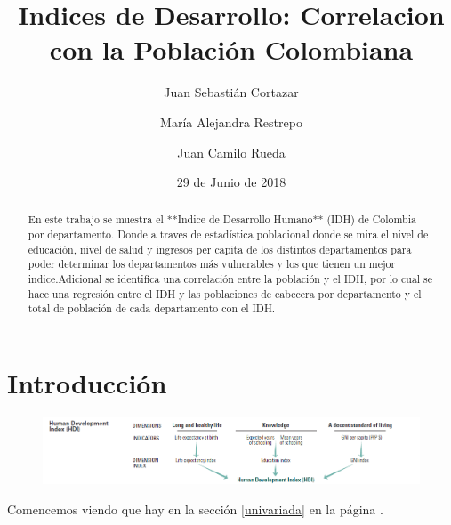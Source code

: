 \documentclass{article}
\title{Indices de Desarrollo: Correlacion con la Población Colombiana}
\author[1]{\normalsize Juan Sebastián Cortazar}
\author[2]{\normalsize María Alejandra Restrepo}
\author[3]{\normalsize Juan Camilo Rueda}
\affil[1,2,3]{\small  Universidad de los Andes\\
\texttt{{js.cortazar533,ma.restrepot,jc.rueda169}@uniandes.edu.col}}
\date{29 de Junio de 2018}
\begin{document}


\maketitle


\begin{abstract}
En este trabajo se muestra el **Indice de Desarrollo Humano** (IDH) de Colombia por departamento. Donde a traves de estadística poblacional donde se mira el nivel de educación, nivel de salud y ingresos per capita de los distintos departamentos para poder determinar los departamentos más vulnerables y los que tienen un mejor indice.Adicional se identifica una correlación entre la población y el IDH, por lo cual se hace una regresión entre el IDH y las poblaciones de cabecera por departamento y el total de población de cada departamento con el IDH. 
\end{abstract}

\section*{Introducción}




\begin{figure}[h]
\centering
\includegraphics{hdiCalc}
\end{figure}


Comencemos viendo que hay en la sección \ref{univariada} en la página \pageref{univariada}.

\clearpage




%




\end{document}
